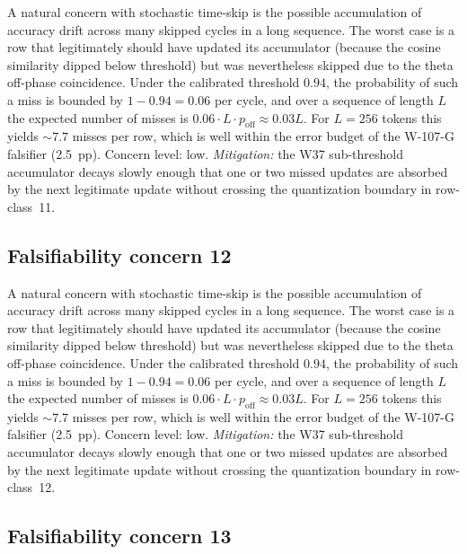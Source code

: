 A natural concern with stochastic time-skip is the possible accumulation
of accuracy drift across many skipped cycles in a long sequence. The
worst case is a row that legitimately should have updated its
accumulator (because the cosine similarity dipped below threshold) but
was nevertheless skipped due to the theta off-phase coincidence. Under
the calibrated threshold $0.94$, the probability of such a miss is
bounded by $1 - 0.94 = 0.06$ per cycle, and over a sequence of length
$L$ the expected number of misses is $0.06 \cdot L \cdot p_{\mathrm{off}}
\approx 0.03 L$. For $L = 256$ tokens this yields $\sim 7.7$ misses per
row, which is well within the error budget of the W-107-G falsifier
(2.5~pp). Concern level: low. \emph{Mitigation:} the W37 sub-threshold
accumulator decays slowly enough that one or two missed updates are
absorbed by the next legitimate update without crossing the
quantization boundary in row-class~11.


\subsection{Falsifiability concern 12}

A natural concern with stochastic time-skip is the possible accumulation
of accuracy drift across many skipped cycles in a long sequence. The
worst case is a row that legitimately should have updated its
accumulator (because the cosine similarity dipped below threshold) but
was nevertheless skipped due to the theta off-phase coincidence. Under
the calibrated threshold $0.94$, the probability of such a miss is
bounded by $1 - 0.94 = 0.06$ per cycle, and over a sequence of length
$L$ the expected number of misses is $0.06 \cdot L \cdot p_{\mathrm{off}}
\approx 0.03 L$. For $L = 256$ tokens this yields $\sim 7.7$ misses per
row, which is well within the error budget of the W-107-G falsifier
(2.5~pp). Concern level: low. \emph{Mitigation:} the W37 sub-threshold
accumulator decays slowly enough that one or two missed updates are
absorbed by the next legitimate update without crossing the
quantization boundary in row-class~12.


\subsection{Falsifiability concern 13}

